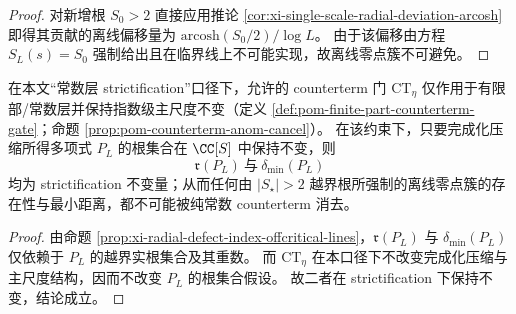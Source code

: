 \begin{proof}
对新增根 \(S_0>2\) 直接应用推论 \ref{cor:xi-single-scale-radial-deviation-arcosh} 即得其贡献的离线偏移量为 \(\mathrm{arcosh}(S_0/2)/\log L\)。
由于该偏移由方程 \(S_L(s)=S_0\) 强制给出且在临界线上不可能实现，故离线零点簇不可避免。
\end{proof}

\begin{proposition}\label{prop:xi-radial-defect-index-counterterm-invariant}
在本文“常数层 strictification”口径下，允许的 counterterm 门 \(\mathrm{CT}_\eta\) 仅作用于有限部/常数层并保持指数级主尺度不变（定义 \ref{def:pom-finite-part-counterterm-gate}；命题 \ref{prop:pom-counterterm-anom-cancel}）。
在该约束下，只要完成化压缩所得多项式 \(P_L\) 的根集合在 \(\CC[S]\) 中保持不变，则
\[
\mathfrak r(P_L)\ \text{与}\ \delta_{\min}(P_L)
\]
均为 strictification 不变量；从而任何由 \(|S_\star|>2\) 越界根所强制的离线零点簇的存在性与最小距离，都不可能被纯常数 counterterm 消去。
\end{proposition}

\begin{proof}
由命题 \ref{prop:xi-radial-defect-index-offcritical-lines}，\(\mathfrak r(P_L)\) 与 \(\delta_{\min}(P_L)\) 仅依赖于 \(P_L\) 的越界实根集合及其重数。
而 \(\mathrm{CT}_\eta\) 在本口径下不改变完成化压缩与主尺度结构，因而不改变 \(P_L\) 的根集合假设。
故二者在 strictification 下保持不变，结论成立。
\end{proof}
